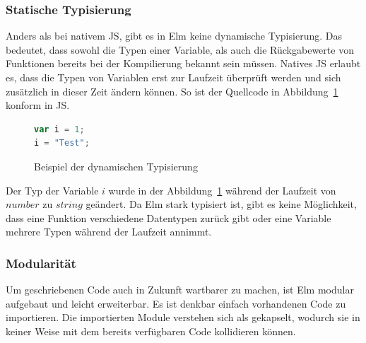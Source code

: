 \subsubsection{Statische Typisierung}
\label{sec:Statische Typisierung}
Anders als bei nativem \ac{JS}, gibt es in Elm keine dynamische Typisierung. Das bedeutet, dass sowohl die Typen einer Variable, als auch die Rückgabewerte von Funktionen bereits bei der Kompilierung bekannt sein müssen. Natives \ac{JS} erlaubt es, dass die Typen von Variablen erst zur Laufzeit überprüft werden und sich zusätzlich in dieser Zeit ändern können. So ist der Quellcode in Abbildung~\ref{fig:dynamische-typisierung} konform in \ac{JS}.
\begin{figure}[ht]
\begin{lstlisting}[language=JavaScript]
var i = 1;
i = "Test";
\end{lstlisting}
\caption{Beispiel der dynamischen Typisierung}\label{fig:dynamische-typisierung}
\end{figure}
Der Typ der Variable $i$ wurde in der Abbildung~\ref{fig:dynamische-typisierung} während der Laufzeit von $number$ zu $string$ geändert. Da Elm stark typisiert ist, gibt es keine Möglichkeit, dass eine Funktion verschiedene Datentypen zurück gibt oder eine Variable mehrere Typen während der Laufzeit annimmt.

\subsubsection{Modularität}
\label{sec:Modularität}
Um geschriebenen Code auch in Zukunft wartbarer zu machen, ist Elm modular aufgebaut und leicht erweiterbar. Es ist denkbar einfach vorhandenen Code zu importieren. Die importierten Module verstehen sich als gekapselt, wodurch sie in keiner Weise mit dem bereits verfügbaren Code kollidieren können.


